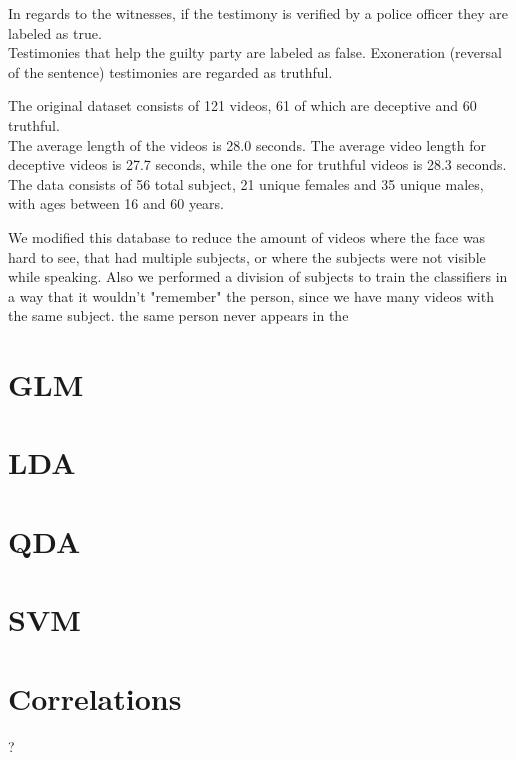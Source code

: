 In regards to the witnesses, if the testimony is verified by a police officer they are labeled as true. \\ Testimonies that help the guilty party are labeled as false. Exoneration (reversal of the sentence) testimonies are regarded as truthful.

The original dataset consists of 121 videos, 61 of which are deceptive and 60 truthful. \\
The average length of the videos is 28.0 seconds. The average video length for deceptive videos is 27.7 seconds, while the one for truthful videos is 28.3 seconds. \\
The data consists of 56 total subject, 21 unique females and 35 unique males, with ages between 16 and 60 years.


We modified this database to reduce the amount of videos where the face was hard to see, that had multiple subjects, or where the subjects were not visible while speaking.
Also we performed a division of subjects to train the classifiers in a way that it wouldn't "remember" the person, since we have many videos with the same subject. 
the same person never appears in the 



\section{GLM}

\section{LDA}

\section{QDA}

\section{SVM}

\section{Correlations} ?